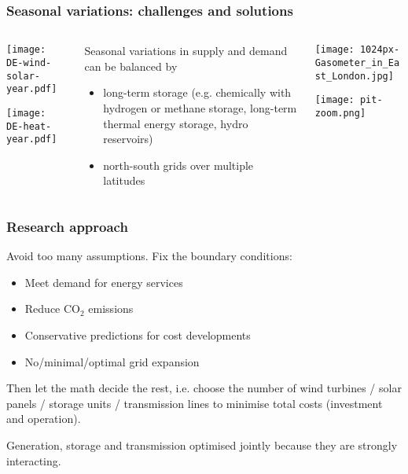 \documentclass[10pt,aspectratio=169,dvipsnames]{beamer}
\def\co2{CO${}_2$}
\let\olditem\item
\renewcommand{\item}{%
\olditem\vspace{5pt}}
\begin{document}
\begin{frame}
  \frametitle{Seasonal variations: challenges and solutions}

  \begin{columns}[T]
    \begin{column}{5cm}
      \texttt{[image: DE-wind-solar-year.pdf]}

      \texttt{[image: DE-heat-year.pdf]}
    \end{column}
    \begin{column}{4cm}
      \alert{Seasonal} variations in supply and demand can be balanced by
      \begin{itemize}
      \item \alert{long-term storage} (e.g. chemically with hydrogen or methane storage, long-term thermal energy storage, hydro reservoirs)
      \item \alert{north-south grids over multiple latitudes}
      \end{itemize}

    \end{column}
    \begin{column}{5cm}
      \texttt{[image: 1024px-Gasometer\_in\_East\_London.jpg]}

      \vspace{.2cm}

      \texttt{[image: pit-zoom.png]}
    \end{column}
  \end{columns}

\end{frame}



\begin{frame}
  \frametitle{Research approach}

  Avoid too many assumptions. Fix the \alert{boundary conditions}:

  \begin{itemize}
  \item Meet demand for energy services
  \item Reduce \co2 emissions
  \item Conservative predictions for cost developments
  \item No/minimal/optimal grid expansion
  \end{itemize}

  Then \alert{let the math decide the rest}, i.e. choose the number of
  wind turbines / solar panels / storage units / transmission lines to
  minimise total costs (investment \alert{and} operation).

  \vspace{.3cm}

  Generation, storage and transmission optimised \alert{jointly}
  because they are \alert{strongly interacting}.
\end{frame}
\end{document}
